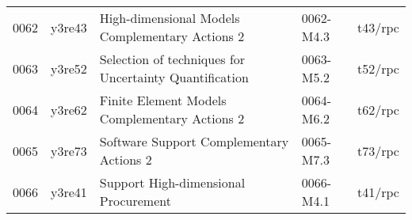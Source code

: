 \begin{longtable}{|p{0.8cm}|p{1.4cm}|p{10.0cm}|p{2.2cm}|p{1.2cm}|}
0062 & y3re43\cite{y3re43} & High-dimensional Models Complementary Actions 2 &  0062-M4.3 & t43/rpc \\
0063 & y3re52\cite{y3re52} & Selection of techniques for Uncertainty Quantification & 0063-M5.2 & t52/rpc \\
0064 & y3re62\cite{y3re62} & Finite Element Models Complementary Actions 2 &  0064-M6.2 & t62/rpc \\
0065 & y3re73\cite{y3re73} & Software Support Complementary Actions 2 &  0065-M7.3 & t73/rpc \\
0066 & y3re41\cite{y3re41} & Support High-dimensional Procurement & 0066-M4.1 & t41/rpc \\
\hline
\end{longtable}
